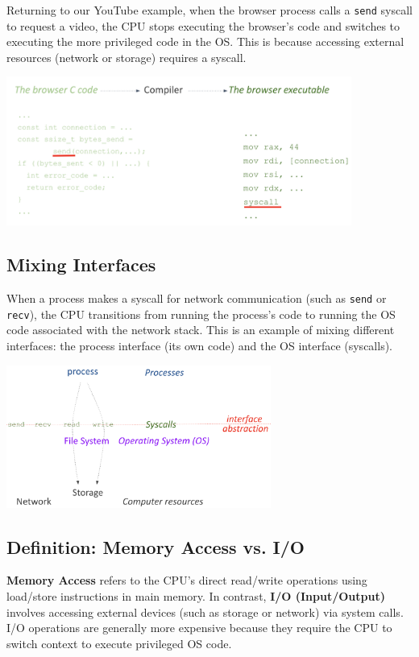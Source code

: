 Returning to our YouTube example, when the browser process calls a \texttt{send} syscall to request a video, the CPU stops executing the browser’s code and switches to executing the more privileged code in the OS. This is because accessing external resources (network or storage) requires a syscall.

\begin{center}
  \includegraphics[width=0.85\textwidth]{chapters/L1/images/syscalls2.png}
\end{center}

\subsection{Mixing Interfaces}
When a process makes a syscall for network communication (such as \texttt{send} or \texttt{recv}), the CPU transitions from running the process’s code to running the OS code associated with the network stack. This is an example of mixing different interfaces: the process interface (its own code) and the OS interface (syscalls).
\begin{center}
  \includegraphics[width=0.65\textwidth]{chapters/L1/images/mix_int.png}
\end{center}

\subsection{Definition: Memory Access vs. I/O}
\begin{definition}
\textbf{Memory Access} refers to the CPU’s direct read/write operations using load/store instructions in main memory. In contrast, \textbf{I/O (Input/Output)} involves accessing external devices (such as storage or network) via system calls. I/O operations are generally more expensive because they require the CPU to switch context to execute privileged OS code.
\end{definition}

